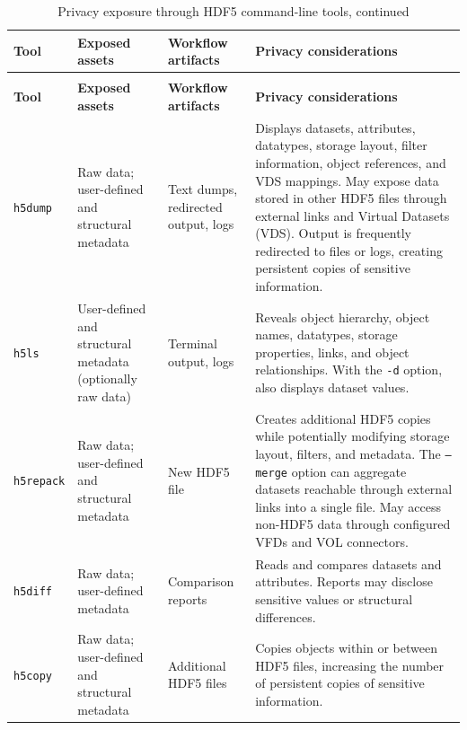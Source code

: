 \documentclass[../main.tex]{subfiles}
\begin{document}
\begin{longtable}{@{}p{0.12\widetablewidth}p{0.22\widetablewidth}p{0.18\widetablewidth}p{0.48\widetablewidth}@{}}
\caption{Privacy exposure through HDF5 command-line tools}
\label{tab:hdf5-tools-privacy}\\
\hline
\textbf{Tool} &
\textbf{Exposed assets} &
\textbf{Workflow artifacts} &
\textbf{Privacy considerations} \\
\hline
\endfirsthead

\caption[]{Privacy exposure through HDF5 command-line tools, continued}\\
\hline
\textbf{Tool} &
\textbf{Exposed assets} &
\textbf{Workflow artifacts} &
\textbf{Privacy considerations} \\
\hline
\endhead

\hline
\endfoot

\texttt{h5dump} &
Raw data; user-defined and structural metadata &
Text dumps, redirected output, logs &
Displays datasets, attributes, datatypes, storage layout, filter information, object references, and VDS mappings. May expose data stored in other HDF5 files through external links and Virtual Datasets (VDS). Output is frequently redirected to files or logs, creating persistent copies of sensitive information.\\
\hline

\texttt{h5ls} &
User-defined and structural metadata (optionally raw data) &
Terminal output, logs &
Reveals object hierarchy, object names, datatypes, storage properties, links, and object relationships. With the \texttt{-d} option, also displays dataset values.\\
\hline

\texttt{h5repack} &
Raw data; user-defined and structural metadata &
New HDF5 file &
Creates additional HDF5 copies while potentially modifying storage layout, filters, and metadata. The \texttt{--merge} option can aggregate datasets reachable through external links into a single file. May access non-HDF5 data through configured VFDs and VOL connectors.\\
\hline

\texttt{h5diff} &
Raw data; user-defined metadata &
Comparison reports &
Reads and compares datasets and attributes. Reports may disclose sensitive values or structural differences.\\
\hline

\texttt{h5copy} &
Raw data; user-defined and structural metadata &
Additional HDF5 files &
Copies objects within or between HDF5 files, increasing the number of persistent copies of sensitive information.\\
\hline


\end{longtable}
\end{document}

